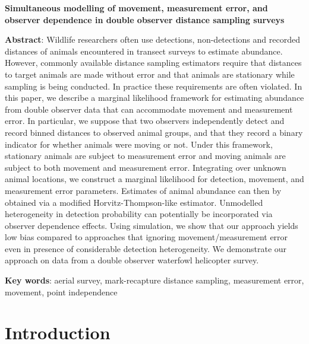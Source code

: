 \documentclass[12pt,fleqn]{article}
\begin{document}
\doublespacing

\textbf{Simultaneous modelling of movement, measurement error, and observer dependence in double observer distance sampling surveys}

\linenumbers

\bigskip

\textbf{Abstract}: Wildlife researchers often use detections, non-detections and recorded distances of animals encountered in transect surveys to estimate abundance. However, commonly available distance sampling estimators require that distances to target animals are made without error and that animals are stationary while sampling is being conducted.  In practice these requirements are often violated. In this paper, we describe a marginal likelihood framework for estimating abundance from double observer data that can accommodate movement and measurement error.  In particular, we suppose that two observers independently detect and record binned distances to observed animal groups, and that they record a binary indicator for whether animals were moving or not.  Under this framework, stationary animals are subject to measurement error and moving animals are subject to both movement and measurement error.  Integrating over unknown animal locations, we construct a marginal likelihood for detection, movement, and measurement error parameters. Estimates of animal abundance can then by obtained via a modified Horvitz-Thompson-like estimator.  Unmodelled heterogeneity in detection probability can potentially be incorporated via observer dependence effects.  Using simulation, we show that our approach yields low bias compared to approaches that ignoring movement/measurement error even in presence of considerable detection heterogeneity.  We demonstrate our approach on data from a double observer waterfowl helicopter survey.


\textbf{Key words}: aerial survey, mark-recapture distance sampling, measurement error, movement, point independence



\def\VAR{{\rm Var}\,}
\def\COV{{\rm Cov}\,}
\def\Prob{{\rm P}\,}
\def\bfX{\bf X}
\def\bfbeta{\boldsymbol{\beta}}
\def\bfdelta{\boldsymbol{\delta}}
\def\bfeta{\boldsymbol{\eta}}
\def\bfphi{\pmb{\phi}}
\def\bftheta{\pmb{\theta}}
\def\bfpsi{\pmb{\psi}}
\def\bfPsi{\pmb{\Psi}}
\def\bfpi{\pmb{\pi}}
\def\bfp{{\bf p}}
\def\bfGamma{\pmb{\Gamma}}




\section{Introduction}
\end{document}
